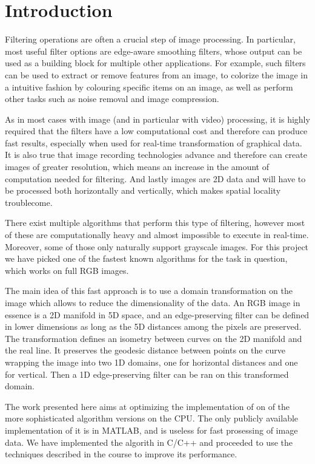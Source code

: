 \section{Introduction}\label{sec:intro}

Filtering operations are often a crucial step of image processing. In
particular, most useful filter options are edge-aware smoothing filters, 
whose output can be used as a building block for multiple other applications.
For example, such filters can be used to extract or remove features from an
image, to colorize the image in a intuitive fashion by colouring specific
items on an image, as well as perform other tasks such as noise removal and
image compression.

As in most cases with image (and in particular with video) processing, it is
highly required that the filters have a low computational cost and therefore
can produce fast results, especially when used for real-time transformation of
graphical data. It is also true that image recording technologies advance and 
therefore can create images of greater resolution, which means an increase in
the amount of computation needed for filtering. And lastly images are 2D data
and will have to be processed both horizontally and vertically, which makes
spatial locality troublecome.

There exist multiple algorithms that perform this type of filtering, however
most of these are computationally heavy and almost impossible to execute in
real-time. Moreover, some of those only naturally support grayscale images. 
For this project we have picked one of the fastest known algorithms for the
task in question, which works on full RGB images.

The main idea of this fast approach is to use a domain transformation on the
image which allows to reduce the dimensionality of the data. An RGB image in
essence is a 2D manifold in 5D space, and an edge-preserving filter can be
defined in lower dimensions as long as the 5D distances among the pixels are
preserved. The transformation defines an isometry between curves on the 2D
manifold and the real line. It preserves the geodesic distance between points
on the curve wrapping the image into two 1D domains, one for horizontal 
distances and one for vertical. Then a 1D edge-preserving filter can be ran on
this transformed domain.

The work presented here aims at optimizing the implementation of on of the 
more sophisticated algorithm versions on the CPU. The only publicly available
implementation of it is in MATLAB, and is useless for fast prosessing of image
data. We have implemented the algorith in C/C++ and proceeded to use the
techniques described in the course to improve its performance.

